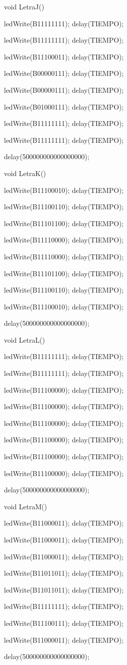 \documentclass{article}
\begin{document}
void LetraJ(){
   
   ledWrite(B11111111); delay(TIEMPO);
   
   ledWrite(B11111111); delay(TIEMPO);
   
   ledWrite(B11100011); delay(TIEMPO);
   
   ledWrite(B00000111); delay(TIEMPO);
   
   ledWrite(B00000111); delay(TIEMPO);
   
   ledWrite(B01000111); delay(TIEMPO);
   
   ledWrite(B11111111); delay(TIEMPO);
   
   ledWrite(B11111111); delay(TIEMPO);
   
   delay(500000000000000000);}

void LetraK(){
   
   ledWrite(B11100010); delay(TIEMPO);
   
   ledWrite(B11100110); delay(TIEMPO);
   
   ledWrite(B11101100); delay(TIEMPO);
   
   ledWrite(B11110000); delay(TIEMPO);
   
   ledWrite(B11110000); delay(TIEMPO);
   
   ledWrite(B11101100); delay(TIEMPO);
   
   ledWrite(B11100110); delay(TIEMPO);
   
   ledWrite(B11100010); delay(TIEMPO);
   
   delay(500000000000000000);}

void LetraL(){
   
   ledWrite(B11111111); delay(TIEMPO);
   
   ledWrite(B11111111); delay(TIEMPO);
   
   ledWrite(B11100000); delay(TIEMPO);
   
   ledWrite(B11100000); delay(TIEMPO);
   
   ledWrite(B11100000); delay(TIEMPO);
   
   ledWrite(B11100000); delay(TIEMPO);
   
   ledWrite(B11100000); delay(TIEMPO);
   
   
   ledWrite(B11100000); delay(TIEMPO);
   
   delay(500000000000000000);}

void LetraM(){
   
   ledWrite(B11000011); delay(TIEMPO);
   
   ledWrite(B11000011); delay(TIEMPO);
   
   ledWrite(B11000011); delay(TIEMPO);
   
   ledWrite(B11011011); delay(TIEMPO);
   
   ledWrite(B11011011); delay(TIEMPO);
   
   ledWrite(B11111111); delay(TIEMPO);
   
   ledWrite(B11100111); delay(TIEMPO);
   
   ledWrite(B11000011); delay(TIEMPO);
   
   delay(500000000000000000);}
\end{document}
